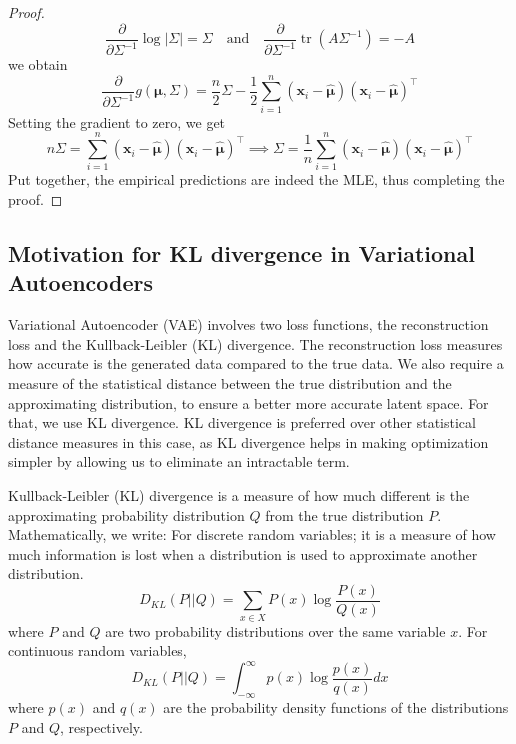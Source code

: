 \begin{proof}
    \[
    \frac{\partial}{\partial \Sigma^{-1}} \log |\Sigma| = \Sigma
    \quad \text{and} \quad
    \frac{\partial}{\partial \Sigma^{-1}} \operatorname{tr}(A\Sigma^{-1}) = -A
    \]
    we obtain
    \[
    \frac{\partial}{\partial \Sigma^{-1}} g(\boldsymbol{\mu},\Sigma) = \frac{n}{2}\Sigma - \frac{1}{2}\sum_{i=1}^n (\mathbf{x}_i - \hat{\boldsymbol{\mu}})(\mathbf{x}_i - \hat{\boldsymbol{\mu}})^\top
    \]
    Setting the gradient to zero, we get
    \[
    n\Sigma = \sum_{i=1}^n (\mathbf{x}_i - \hat{\boldsymbol{\mu}})(\mathbf{x}_i - \hat{\boldsymbol{\mu}})^\top
    \implies
    \Sigma = \frac{1}{n} \sum_{i=1}^n (\mathbf{x}_i - \hat{\boldsymbol{\mu}})(\mathbf{x}_i - \hat{\boldsymbol{\mu}})^\top
    \]
    Put together, the empirical predictions are indeed the MLE, thus completing the proof.
\end{proof}

\subsection{Motivation for KL divergence in Variational Autoencoders}
Variational Autoencoder (VAE) involves two loss functions, the reconstruction loss and the Kullback-Leibler (KL) divergence. The reconstruction loss measures how accurate is the generated data compared to the true data. We also require a measure of the statistical distance between the true distribution and the approximating distribution, to ensure a better more accurate latent space. For that, we use KL divergence.
KL divergence is preferred over other statistical distance measures in this case, as KL divergence helps in making optimization simpler by allowing us to eliminate an intractable term.
\begin{definition}
Kullback-Leibler (KL) divergence is a measure of how much different is the approximating probability distribution \( Q \) from the true distribution \( P \). Mathematically, we write: 
For discrete random variables; it is a measure of how much information is lost when a distribution is used to approximate another distribution.
\begin{equation}
D_{KL}(P || Q) = \sum_{x \in X} P(x) \log \frac{P(x)}{Q(x)}
\end{equation}
where \( P \) and \( Q \) are two probability distributions over the same variable \( x \). \newline
For continuous random variables, 
\begin{equation}
D_{KL}(P || Q) = \int_{-\infty}^{\infty} p(x) \log \frac{p(x)}{q(x)} dx
\end{equation}
where \( p(x) \) and \( q(x) \) are the probability density functions of the distributions \( P \) and \( Q \), respectively.
\end{definition}
